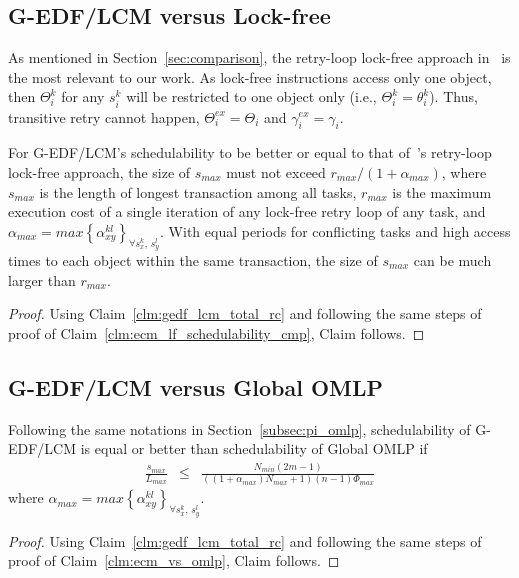 \subsection{G-EDF/LCM versus Lock-free}
\label{gedf-lcm-lock-free}
%
As mentioned in Section~\ref{sec:comparison}, the retry-loop lock-free approach in~\cite{key-5} is the most relevant to our work. As lock-free instructions access only one object, then $\Theta_i^k$ for any $s_i^k$ will be restricted to one object only (i.e., $\Theta_i^k=\theta_i^k$). Thus, transitive retry cannot happen, $\Theta_i^{ex}=\Theta_i$ and $\gamma_i^{ex}=\gamma_i$.
%
\begin{clm}\label{gedf-lcm-lock-free_clm}
%
For G-EDF/LCM's schedulability to be better or equal to that of~\cite{key-5}'s retry-loop lock-free approach, the size of $s_{max}$ must not exceed $r_{max}/\left(1+\alpha_{max}\right)$, where $s_{max}$ is the length of longest transaction among all tasks, $r_{max}$ is the maximum execution cost of a single iteration of any lock-free retry loop of any task, and  $\alpha_{max}=max\left\{\alpha_{xy}^{kl}\right\}_{\forall s_x^k,\,s_y^l}$. With equal periods for conflicting tasks and high access times to each object within the same transaction, the size of $s_{max}$ can be much larger than $r_{max}$.
%
\end{clm}
%
\begin{proof}\normalfont
%
Using Claim~\ref{clm:gedf_lcm_total_rc} and following the same steps of proof of Claim~\ref{clm:ecm_lf_schedulability_cmp}, Claim follows.
%
\end{proof}
%
\subsection{G-EDF/LCM versus Global OMLP}\label{subsec:gedf_lcm_vs_omlp}
%
\begin{clm}\label{clm:gedf_lcm_vs_omlp}
%
Following the same notations in Section~\ref{subsec:pi_omlp}, schedulability of G-EDF/LCM is equal or better than schedulability of Global OMLP if 
\begin{eqnarray}
\frac{s_{max}}{L_{max}} & \le & \frac{N_{min}\left(2m-1\right)}{\left(\left(1+\alpha_{max}\right)N_{max}+1\right)(n-1)\Phi_{max}}\label{eq:gedf_lcm_omlp_cmp_final}
\end{eqnarray}
%
where $\alpha_{max}=max\left\{\alpha_{xy}^{kl}\right\}_{\forall s_x^k,\,s_y^l}$.
\end{clm}
%
\begin{proof}
%
Using Claim~\ref{clm:gedf_lcm_total_rc} and following the same steps of proof of Claim~\ref{clm:ecm_vs_omlp}, Claim follows.
%
\end{proof}
%
